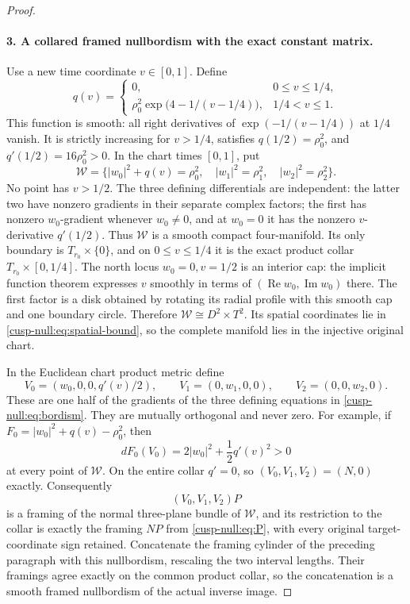 \begin{proof}
\paragraph{3. A collared framed nullbordism with the exact constant matrix.}
Use a new time coordinate \(v\in[0,1]\). Define
\begin{equation}
 q(v)=
 \begin{cases}
 0,&0\leq v\leq1/4,\\
 \rho_0^2\exp\bigl(4-1/(v-1/4)\bigr),&1/4<v\leq1.
 \end{cases}
 \label{cusp-null:eq:q}
\end{equation}
This function is smooth: all right derivatives of
\(\exp(-1/(v-1/4))\) at \(1/4\) vanish. It is strictly increasing
for \(v>1/4\), satisfies \(q(1/2)=\rho_0^2\), and
\(q'(1/2)=16\rho_0^2>0\).
In the chart times \([0,1]\), put
\begin{equation}
 \mathcal W=
 \{|w_0|^2+q(v)=\rho_0^2,\quad
       |w_1|^2=\rho_1^2,\quad|w_2|^2=\rho_2^2\}.
 \label{cusp-null:eq:bordism}
\end{equation}
No point has \(v>1/2\). The three defining differentials are independent:
the latter two have nonzero gradients in their separate complex factors;
the first has nonzero \(w_0\)-gradient whenever \(w_0\ne0\), and at
\(w_0=0\) it has the nonzero \(v\)-derivative \(q'(1/2)\).
Thus \(\mathcal W\) is a smooth compact four-manifold. Its only
boundary is \(T_{r_0}\times\{0\}\), and on \(0\leq v\leq1/4\)
it is the exact product collar \(T_{r_0}\times[0,1/4]\).
The north locus \(w_0=0,v=1/2\) is an interior cap: the implicit
function theorem expresses \(v\) smoothly in terms of
\((\operatorname{Re}w_0,\operatorname{Im}w_0)\) there. The first
factor is a disk obtained by rotating its radial profile with this smooth
cap and one boundary circle. Therefore
\(\mathcal W\cong D^2\times T^2\).
Its spatial coordinates lie in \eqref{cusp-null:eq:spatial-bound}, so the complete
manifold lies in the injective original chart.

In the Euclidean chart product metric define
\[
 V_0=(w_0,0,0,q'(v)/2),\qquad
 V_1=(0,w_1,0,0),\qquad V_2=(0,0,w_2,0).
\]
These are one half of the gradients of the three defining equations
in \eqref{cusp-null:eq:bordism}. They are mutually orthogonal and never zero.
For example, if \(F_0=|w_0|^2+q(v)-\rho_0^2\), then
\[
 dF_0(V_0)=2|w_0|^2+\frac12q'(v)^2>0
\]
at every point of \(\mathcal W\). On the entire collar \(q'=0\), so
\((V_0,V_1,V_2)=(N,0)\) exactly. Consequently
\begin{equation}
 (V_0,V_1,V_2)P
 \label{cusp-null:eq:extended-frame}
\end{equation}
is a framing of the normal three-plane bundle of \(\mathcal W\),
and its restriction to the collar is exactly the framing \(NP\) from
\eqref{cusp-null:eq:P}, with every original target-coordinate sign retained.
Concatenate the framing cylinder of the preceding paragraph with this
nullbordism, rescaling the two interval lengths. Their framings agree
exactly on the common product collar, so the concatenation is a smooth
framed nullbordism of the actual inverse image.


\end{proof}

